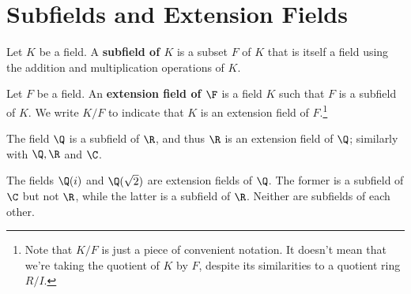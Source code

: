 \documentclass[math1530-lecture-notes]{subfiles}
\begin{document}
\section{Subfields and Extension Fields}

\begin{definition}[Subfields]{}
  Let $K$ be a field. A \textbf{subfield of $K$} is a subset $F$ of $K$ that is itself a field using
  the addition and multiplication operations of $K$.
\end{definition}

\begin{definition}{}
  Let $F$ be a field. An \textbf{extension field of $\F$} is a field $K$ such that $F$ is a subfield
  of $K$. We write $K / F$ to indicate that $K$ is an extension field of $F$.\footnote{Note that $K
  / F$ is just a piece of convenient notation. It doesn't mean that we're taking the quotient of $K$
by $F$, despite its similarities to a quotient ring $R / I$.}
\end{definition}

\begin{example}
  The field $\Q$ is a subfield of $\R$, and thus $\R$ is an extension field of $\Q$; similarly with
  $\Q,\R$ and $\C$.

  The fields $\Q(i)$ and $\Q(\sqrt{2})$ are extension fields of $\Q$. The former is a subfield of
  $\C$ but not $\R$, while the latter is a subfield of $\R$. Neither are subfields of each other.
\end{example}
\end{document}
